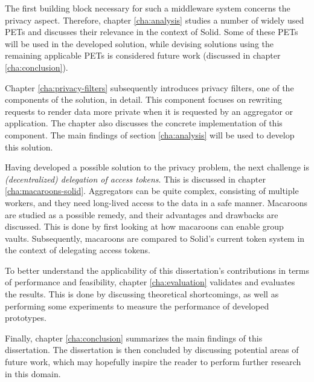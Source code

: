 The first building block necessary for such a middleware system concerns the privacy aspect. Therefore, chapter \ref{cha:analysis} studies a number of widely used \gls{PETs} and discusses their relevance in the context of Solid. Some of these \gls{PETs} will be used in the developed solution, while devising solutions using the remaining applicable \gls{PETs} is considered future work (discussed in chapter \ref{cha:conclusion}).

Chapter \ref{cha:privacy-filters} subsequently introduces privacy filters, one of the components of the solution, in detail. This component focuses on rewriting requests to render data more private when it is requested by an aggregator or application. The chapter also discusses the concrete implementation of this component. The main findings of section \ref{cha:analysis} will be used to develop this solution.

Having developed a possible solution to the privacy problem, the next challenge is \textit{(decentralized) delegation of access tokens}. This is discussed in chapter \ref{cha:macaroons-solid}. Aggregators can be quite complex, consisting of multiple workers, and they need long-lived access to the data in a safe manner. Macaroons are studied as a possible remedy, and their advantages and drawbacks are discussed. This is done by first looking at how macaroons can enable group vaults. Subsequently, macaroons are compared to Solid's current token system in the context of delegating access tokens.

\noindent To better understand the applicability of this dissertation's contributions in terms of performance and feasibility, chapter \ref{cha:evaluation} validates and evaluates the results. This is done by discussing theoretical shortcomings, as well as performing some experiments to measure the performance of developed prototypes. 

Finally, chapter \ref{cha:conclusion} summarizes the main findings of this dissertation. The dissertation is then concluded by discussing potential areas of future work, which may hopefully inspire the reader to perform further research in this domain.

